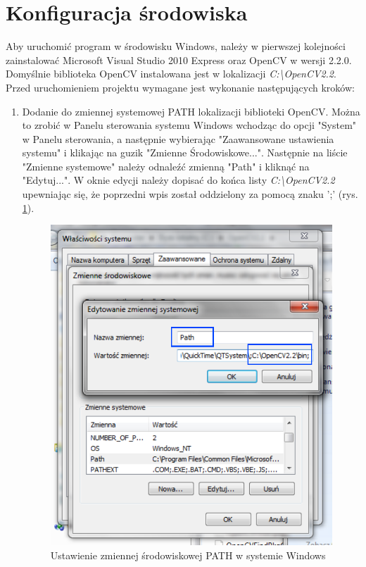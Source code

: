 \section{Konfiguracja środowiska}
Aby uruchomić program w środowisku Windows, należy w pierwszej kolejności zainstalować Microsoft Visual Studio 2010 Express oraz OpenCV w wersji 2.2.0. Domyślnie biblioteka OpenCV instalowana jest w lokalizacji \emph{C:\textbackslash OpenCV2.2}. Przed uruchomieniem projektu wymagane jest wykonanie następujących kroków:
\begin{enumerate}
  \item Dodanie do zmiennej systemowej PATH lokalizacji biblioteki OpenCV. Można to zrobić w Panelu sterowania systemu Windows wchodząc do opcji "System" w Panelu sterowania, a następnie wybierając "Zaawansowane ustawienia systemu" i klikając na guzik "Zmienne Środowiskowe...". Następnie na liście "Zmienne systemowe" należy odnaleźć zmienną "Path" i kliknąć na "Edytuj...". W oknie edycji należy dopisać do końca listy \emph{C:\textbackslash OpenCV2.2} upewniając się, że poprzedni wpis został oddzielony za pomocą znaku ';' (rys. \ref{fig:ustawienia-path}).
  
	\begin{figure}[h]
		\centering
		\includegraphics[scale=1.0]{graphics/03_implementacja/ustawienia-path.pdf}
		\caption{ Ustawienie zmiennej środowiskowej PATH w systemie Windows }
		\label{fig:ustawienia-path}
	\end{figure}
  

\end{enumerate}
